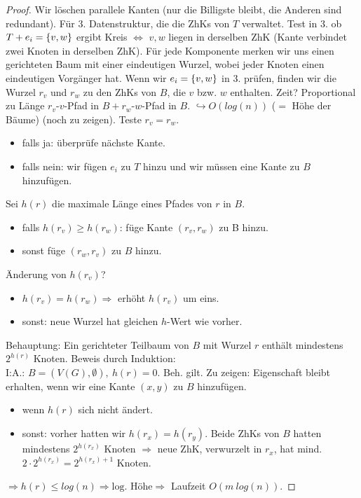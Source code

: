 \begin{proof}
	Wir löschen parallele Kanten (nur die Billigste bleibt, die Anderen sind redundant). Für 3. Datenstruktur, die die ZhKs von $T$ verwaltet. Test in 3. ob $T+e_i = \{v,w\}$ ergibt Kreis $\Leftrightarrow$ $v,w$ liegen in derselben ZhK (Kante verbindet zwei Knoten in derselben ZhK). Für jede Komponente merken wir uns einen gerichteten Baum mit einer eindeutigen Wurzel, wobei jeder Knoten einen eindeutigen Vorgänger hat. Wenn wir $e_i=\{v,w\}$ in 3. prüfen, finden wir die Wurzel $r_v$ und $r_w$ zu den ZhKs von $B$, die $v$ bzw. $w$ enthalten. Zeit? Proportional zu Länge $r_v$-$v$-Pfad in $B + r_w$-$w$-Pfad in $B$. $\hookrightarrow O(log(n))$ ($=$ Höhe der Bäume) (noch zu zeigen). Teste $r_v = r_w$.
	\begin{itemize}
		\item falls ja: überprüfe nächste Kante.
		\item falls nein: wir fügen $e_i$ zu $T$ hinzu und wir müssen eine Kante zu $B$ hinzufügen.
	\end{itemize}
	Sei $h(r)$ die maximale Länge eines Pfades von $r$ in $B$.
	\begin{itemize}
		\item falls $h(r_v)\ge h(r_w)$: füge Kante $(r_v, r_w)$ zu B hinzu.
		\item sonst füge $(r_w, r_v)$ zu $B$ hinzu.
	\end{itemize}
	Änderung von $h(r_v)$?
	\begin{itemize}
		\item $h(r_v) = h(r_w) \Rightarrow$ erhöht $h(r_v)$ um eins.
		\item sonst: neue Wurzel hat gleichen $h$-Wert wie vorher.
	\end{itemize}
	Behauptung: Ein gerichteter Teilbaum von $B$ mit Wurzel $r$ enthält mindestens $2^{h(r)}$ Knoten. Beweis durch Induktion:\\
	I:A.: $B=(V(G), \emptyset),~h(r)=0$. Beh. gilt. Zu zeigen: Eigenschaft bleibt erhalten, wenn wir eine Kante $(x,y)$ zu $B$ hinzufügen.
	\begin{itemize}
		\item wenn $h(r)$ sich nicht ändert.
		\item sonst: vorher hatten wir $h(r_x) = h(r_y)$. Beide ZhKs von $B$ hatten mindestens $2^{h(r_x)}$ Knoten $\Rightarrow$ neue ZhK, verwurzelt in $r_x$, hat mind. $2\cdot2^{h(r_x)} = 2^{h(r_x)+1}$ Knoten. 
	\end{itemize}
	$\Rightarrow h(r) \le log(n) \Rightarrow \text{log. Höhe} \Rightarrow$ Laufzeit $O(m~log(n))$.
\end{proof}
